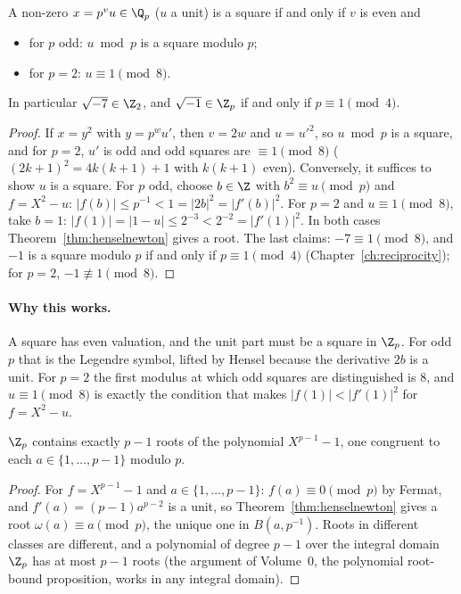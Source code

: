 \begin{corollary}[squares in $\Q_p$]\label{cor:squares}
A non-zero $x=p^vu\in\Q_p$ ($u$ a unit) is a square if and only if $v$ is even and
\begin{itemize}
\item for $p$ odd: $u\bmod p$ is a square modulo $p$;
\item for $p=2$: $u\equiv1\pmod8$.
\end{itemize}
In particular $\sqrt{-7}\in\Z_2$, and $\sqrt{-1}\in\Z_p$ if and only if $p\equiv1\pmod4$.
\end{corollary}
\begin{proof}
If $x=y^2$ with $y=p^wu'$, then $v=2w$ and $u=u'^2$, so $u\bmod p$ is a square, and for $p=2$, $u'$ is odd and odd squares are $\equiv1\pmod8$ ($(2k+1)^2=4k(k+1)+1$ with $k(k+1)$ even). Conversely, it suffices to show $u$ is a square. For $p$ odd, choose $b\in\Z$ with $b^2\equiv u\pmod p$ and $f=X^2-u$: $|f(b)|\le p^{-1}<1=|2b|^2=|f'(b)|^2$. For $p=2$ and $u\equiv1\pmod 8$, take $b=1$: $|f(1)|=|1-u|\le2^{-3}<2^{-2}=|f'(1)|^2$. In both cases Theorem~\ref{thm:henselnewton} gives a root. The last claims: $-7\equiv1\pmod8$, and $-1$ is a square modulo $p$ if and only if $p\equiv1\pmod4$ (Chapter~\ref{ch:reciprocity}); for $p=2$, $-1\not\equiv1\pmod8$.
\end{proof}

\paragraph{Why this works.}
A square has even valuation, and the unit part must be a square in $\Z_p$. For odd $p$ that is the Legendre symbol, lifted by Hensel because the derivative $2b$ is a unit. For $p=2$ the first modulus at which odd squares are distinguished is $8$, and $u\equiv 1\pmod 8$ is exactly the condition that makes $|f(1)|<|f'(1)|^2$ for $f=X^2-u$.

\begin{corollary}\label{cor:teich}
$\Z_p$ contains exactly $p-1$ roots of the polynomial $X^{p-1}-1$, one congruent to each $a\in\{1,\dots,p-1\}$ modulo $p$.
\end{corollary}
\begin{proof}
For $f=X^{p-1}-1$ and $a\in\{1,\dots,p-1\}$: $f(a)\equiv0\pmod p$ by Fermat, and $f'(a)=(p-1)a^{p-2}$ is a unit, so Theorem~\ref{thm:henselnewton} gives a root $\omega(a)\equiv a\pmod p$, the unique one in $B(a,p^{-1})$. Roots in different classes are different, and a polynomial of degree $p-1$ over the integral domain $\Z_p$ has at most $p-1$ roots (the argument of Volume~0, the polynomial root-bound proposition, works in any integral domain).
\end{proof}

